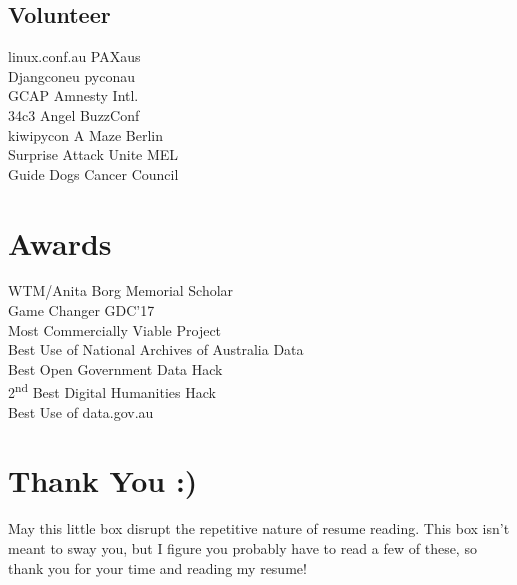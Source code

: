 \documentclass[a4paper]{deedy-resume_twopage} %
\begin{document}
\begin{minipage}[t]{0.25\textwidth}
  \sectionspace
  \subsection{Volunteer}
  \textbullet{} linux.conf.au \textbullet{} PAXaus \\
  \textbullet{} Djangconeu \textbullet{} pyconau \\
  \textbullet{} GCAP \textbullet{} Amnesty Intl.\\
  \textbullet{} 34c3 Angel \textbullet{} BuzzConf \\
  \textbullet{} kiwipycon \textbullet{} A Maze Berlin \\
  \textbullet{} Surprise Attack \textbullet{} Unite MEL \\
  \textbullet{} Guide Dogs \textbullet{} Cancer Council

  \sectionspace %

  \section{Awards}

  \textbullet{}WTM/Anita Borg Memorial Scholar \\
  \textbullet{}Game Changer GDC'17 \\
  \textbullet{} Most Commercially Viable Project\\
  \textbullet{} Best Use of National Archives of Australia Data \\
  \textbullet{} Best Open Government Data Hack \\
  \textbullet{} 2\textsuperscript{nd} Best Digital Humanities Hack \\
  \textbullet{} Best Use of data.gov.au \\

  \sectionspace %


  \section{Thank You :)}
  May this little box disrupt the repetitive nature of resume
  reading. This box isn't meant
  to sway you, but I figure you
  probably have to read a few
  of these, so thank you for your
  time and reading my resume!


\end{minipage} %

\end{document}
